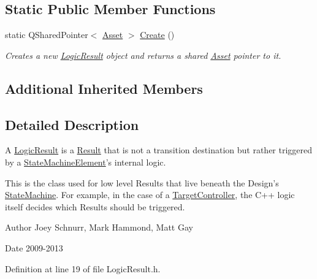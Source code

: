 \subsection*{Static Public Member Functions}
\begin{DoxyCompactItemize}
\item 
\hypertarget{class_picto_1_1_logic_result_a7d8d01f98f5aa4a0829ca51340797b38}{static Q\-Shared\-Pointer$<$ \hyperlink{class_picto_1_1_asset}{Asset} $>$ \hyperlink{class_picto_1_1_logic_result_a7d8d01f98f5aa4a0829ca51340797b38}{Create} ()}\label{class_picto_1_1_logic_result_a7d8d01f98f5aa4a0829ca51340797b38}

\begin{DoxyCompactList}\small\item\em Creates a new \hyperlink{class_picto_1_1_logic_result}{Logic\-Result} object and returns a shared \hyperlink{class_picto_1_1_asset}{Asset} pointer to it. \end{DoxyCompactList}\end{DoxyCompactItemize}
\subsection*{Additional Inherited Members}


\subsection{Detailed Description}
A \hyperlink{class_picto_1_1_logic_result}{Logic\-Result} is a \hyperlink{class_picto_1_1_result}{Result} that is not a transition destination but rather triggered by a \hyperlink{class_picto_1_1_state_machine_element}{State\-Machine\-Element}'s internal logic. 

This is the class used for low level Results that live beneath the Design's \hyperlink{class_picto_1_1_state_machine}{State\-Machine}. For example, in the case of a \hyperlink{class_picto_1_1_target_controller}{Target\-Controller}, the C++ logic itself decides which Results should be triggered. \begin{DoxyAuthor}{Author}
Joey Schnurr, Mark Hammond, Matt Gay 
\end{DoxyAuthor}
\begin{DoxyDate}{Date}
2009-\/2013 
\end{DoxyDate}


Definition at line 19 of file Logic\-Result.\-h.



